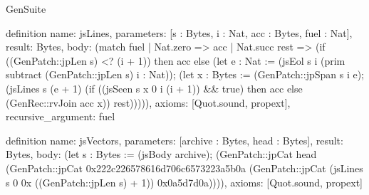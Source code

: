 \begin{lexlean}{GenSuite}
\begin{semanticmodule}
definition{
  name: jsLines,
  parameters: [s : Bytes, i : Nat, acc : Bytes, fuel : Nat],
  result: Bytes,
  body: (match fuel
    | Nat.zero => acc
    | Nat.succ rest => (if ((GenPatch::jpLen s) <? (i + 1)) then acc else (let e : Nat := (jsEol s i (prim subtract (GenPatch::jpLen s) i : Nat)); (let x : Bytes := (GenPatch::jpSpan s i e); (jsLines s (e + 1) (if ((jsSeen s x 0 i (i + 1)) && true) then acc else (GenRec::rvJoin acc x)) rest))))),
  axioms: [Quot.sound, propext],
  recursive_argument: fuel
}

definition{
  name: jsVectors,
  parameters: [archive : Bytes, head : Bytes],
  result: Bytes,
  body: (let s : Bytes := (jsBody archive); (GenPatch::jpCat head (GenPatch::jpCat 0x222c226578616d706c6573223a5b0a (GenPatch::jpCat (jsLines s 0 0x ((GenPatch::jpLen s) + 1)) 0x0a5d7d0a)))),
  axioms: [Quot.sound, propext]
}
\end{semanticmodule}
\end{lexlean}
